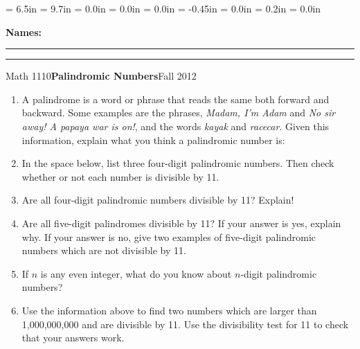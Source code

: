 \documentclass{article}
\begin{document}
\textwidth = 6.5in
\textheight = 9.7in
\oddsidemargin = 0.0in
\evensidemargin = 0.0in
\topmargin = 0.0in
\headheight = -0.45in
\headsep = 0.0in
\parskip = 0.2in
\parindent = 0.0in

\pagestyle{empty}

\textbf{Names:} \rule{6.1in}{0.01in}

\vspace{0.3in}

\noindent\rule{6.7in}{0.01in}

\centerline{Math 1110\hfill{\bf Palindromic Numbers}\hfill Fall 2012}

\vspace{0.2in}

\begin{enumerate}

\item A palindrome is a word or phrase that reads the same both forward and backward. Some examples are the phrases, \textit{Madam, I'm Adam} and \textit{No sir away! A papaya war is on!}, and the words \textit{kayak} and \textit{racecar}. Given this information, explain what you think a palindromic number is:

\vspace{2in}

\item In the space below, list three four-digit palindromic numbers. Then check whether or not each number is divisible by 11.

\vspace{2in}

\item Are all four-digit palindromic numbers divisible by 11? Explain!

\newpage

\item Are all five-digit palindromes divisible by 11?\newline
If your answer is yes, explain why. If your answer is no, give two examples of five-digit palindromic numbers which are not divisible by 11.

\vspace{2.5in}

\item If $n$ is any even integer, what do you know about $n$-digit palindromic numbers?

\vspace{2.5in}

\item Use the information above to find two numbers which are larger than 1,000,000,000 and are divisible by 11. Use the divisibility test for 11 to check that your answers work.


\end{enumerate}
\end{document}
